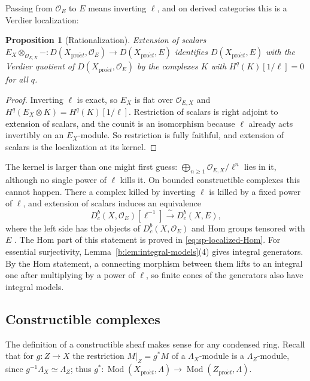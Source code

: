 \documentclass[11pt,a4paper]{article}
\numberwithin{equation}{section}
\newtheorem{proposition}[theorem]{Proposition}
\theoremstyle{definition}
\theoremstyle{remark}
\newcommand{\Dbc}{D^b_c}
\newcommand{\Mod}{\operatorname{Mod}}
\newcommand{\proet}{\mathrm{pro}\acute{e}t}
\begin{document}
Passing from $\mathcal O_E$ to $E$ means inverting $\ell$, and on derived
categories this is a Verdier localization:

\begin{proposition}[Rationalization]
\label{n:rationalization}
Extension of scalars $E_X\otimes_{\mathcal O_{E,X}}-\colon
D(X_{\proet},\mathcal O_E)\to D(X_{\proet},E)$ identifies
$D(X_{\proet},E)$ with the Verdier quotient of $D(X_{\proet},\mathcal O_E)$
by the complexes $K$ with $H^q(K)[1/\ell]=0$ for all $q$.
\end{proposition}
\begin{proof}
Inverting $\ell$ is exact, so $E_X$ is flat over $\mathcal O_{E,X}$ and
$H^q(E_X\otimes K)=H^q(K)[1/\ell]$. Restriction of scalars is right
adjoint to extension of scalars, and the counit is an isomorphism because
$\ell$ already acts invertibly on an $E_X$-module. So restriction is fully
faithful, and extension of scalars is the localization at its kernel.
\end{proof}

The kernel is larger than one might first guess:
$\bigoplus_{n\ge1}\mathcal O_{E,X}/\ell^n$ lies in it, although no single
power of $\ell$ kills it. On bounded constructible complexes this cannot
happen. There a complex killed by inverting $\ell$ is killed by a fixed
power of $\ell$, and extension of scalars induces an equivalence
\[
 \Dbc(X,\mathcal O_E)[\ell^{-1}]\xrightarrow{\ \sim\ }\Dbc(X,E),
\]
where the left side has the objects of $\Dbc(X,\mathcal O_E)$ and Hom
groups tensored with $E$ \cite[Proposition~6.8.14(2)]{BS}. The Hom part of this statement is
proved in \eqref{eq:sp-localized-Hom}. For essential surjectivity,
Lemma~\ref{b:lem:integral-models}(4) gives integral generators. By the
Hom statement, a connecting morphism between them lifts to an integral
one after multiplying by a power of $\ell$, so finite cones of the
generators also have integral models.

\subsection{Constructible complexes}
\label{n:constructible}
The definition of a constructible sheaf makes sense for any condensed
ring. Recall that for $g:Z\to X$ the restriction $M|_Z=g^*M$ of a
$\Lambda_X$-module is a $\Lambda_Z$-module, since
$g^{-1}\Lambda_X\simeq\Lambda_Z$; thus
$g^*\colon\Mod(X_{\proet},\Lambda)\to\Mod(Z_{\proet},\Lambda)$.
\end{document}
